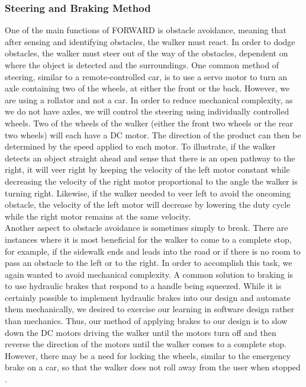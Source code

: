\subsubsection{Steering and Braking Method }
\noindent One of the main functions of FORWARD is obstacle avoidance, meaning that after sensing and identifying obstacles, the walker must react. In order to dodge obstacles, the walker must steer out of the way of the obstacles, dependent on where the object is detected and the surroundings. One common method of steering, similar to a remote-controlled car, is to use a servo motor to turn an axle containing two of the wheels, at either the front or the back. However, we are using a rollator and not a car. In order to reduce mechanical complexity, as we do not have axles, we will control the steering using individually controlled wheels. Two of the wheels of the walker (either the front two wheels or the rear two wheels) will each have a DC motor. The direction of the product can then be determined by the speed applied to each motor. To illustrate, if the walker detects an object straight ahead and sense that there is an open pathway to the right, it will veer right by keeping the velocity of the left motor constant while decreasing the velocity of the right motor proportional to the angle the walker is turning right. Likewise, if the walker needed to veer left to avoid the oncoming obstacle, the velocity of the left motor will decrease by lowering the duty cycle while the right motor remains at the same velocity.\\ 

\noindent Another aspect to obstacle avoidance is sometimes simply to break. There are instances where it is most beneficial for the walker to come to a complete stop, for example, if the sidewalk ends and leads into the road or if there is no room to pass an obstacle to the left or to the right. In order to accomplish this task, we again wanted to avoid mechanical complexity. A common solution to braking is to use hydraulic brakes that respond to a handle being squeezed. While it is certainly possible to implement hydraulic brakes into our design and automate them mechanically, we desired to exercise our learning in software design rather than mechanics. Thus, our method of applying brakes to our design is to slow down the DC motors driving the walker until the motors turn off and then reverse the direction of the motors until the walker comes to a complete stop. However, there may be a need for locking the wheels, similar to the emergency brake on a car, so that the walker does not roll away from the user when stopped \cite{oxford_health_2014}.\\ 

